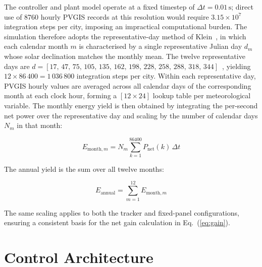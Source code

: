\documentclass[preprint,3p,12pt]{elsarticle}
\begin{document}
The controller and plant model operate at a fixed timestep of
$\Delta t = 0.01\,\mathrm{s}$; direct use of 8760 hourly PVGIS
records at this resolution would require $3.15 \times 10^7$
integration steps per city, imposing an impractical computational
burden. The simulation therefore adopts the representative-day
method of Klein~\cite{Duffie2013}, in which each calendar month $m$
is characterised by a single representative Julian day $d_m$ whose
solar declination matches the monthly mean. The twelve representative
days are $d = [17,\,47,\,75,\,105,\,135,\,162,\,198,\,228,\,258,
\,288,\,318,\,344]$~\cite{Duffie2013}, yielding
$12 \times 86\,400 = 1\,036\,800$ integration steps per city.
Within each representative day, PVGIS hourly values are averaged
across all calendar days of the corresponding month at each clock
hour, forming a $[12 \times 24]$ lookup table per meteorological
variable. The monthly energy yield is then obtained by integrating
the per-second net power over the representative day and scaling by
the number of calendar days $N_m$ in that month:

\begin{equation}
    E_{\mathrm{month},m} = N_m \sum_{k=1}^{86400}
    P_{\mathrm{net}}(k)\,\Delta t
    \label{eq:monthly_energy}
\end{equation}

The annual yield is the sum over all twelve months:

\begin{equation}
    E_{\mathrm{annual}} = \sum_{m=1}^{12} E_{\mathrm{month},m}
    \label{eq:annual_energy}
\end{equation}

The same scaling applies to both the tracker and fixed-panel
configurations, ensuring a consistent basis for the net gain
calculation in Eq.~(\ref{eq:gain}).

\section{Control Architecture}
\label{sec:control}
\end{document}
